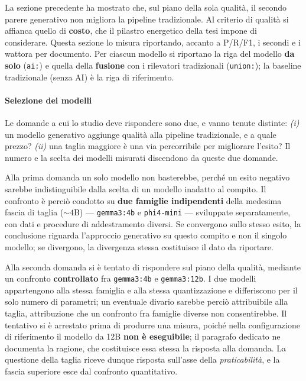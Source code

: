 La sezione precedente ha mostrato che, sul piano della sola qualità, il secondo parere generativo non migliora la pipeline tradizionale. Al criterio di qualità si affianca quello di \textbf{costo}, che il pilastro energetico della tesi impone di considerare. Questa sezione lo misura riportando, accanto a P/R/F1, i secondi e i wattora per documento. Per ciascun modello si riportano la riga del modello \textbf{da solo} (\texttt{ai:}) e quella della \textbf{fusione} con i rilevatori tradizionali (\texttt{union:}); la baseline tradizionale (senza AI) è la riga di riferimento.

\paragraph*{Selezione dei modelli} Le domande a cui lo studio deve rispondere sono due, e vanno tenute distinte: \emph{(i)} un modello generativo aggiunge qualità alla pipeline tradizionale, e a quale prezzo? \emph{(ii)} una taglia maggiore è una via percorribile per migliorare l'esito? Il numero e la scelta dei modelli misurati discendono da queste due domande.

Alla prima domanda un solo modello non basterebbe, perché un esito negativo sarebbe indistinguibile dalla scelta di un modello inadatto al compito. Il confronto è perciò condotto su \textbf{due famiglie indipendenti} della medesima fascia di taglia (${\sim}4$B) --- \texttt{gemma3:4b} e \texttt{phi4-mini} --- sviluppate separatamente, con dati e procedure di addestramento diversi. Se convergono sullo stesso esito, la conclusione riguarda l'approccio generativo su questo compito e non il singolo modello; se divergono, la divergenza stessa costituisce il dato da riportare.

Alla seconda domanda si è tentato di rispondere sul piano della qualità, mediante un confronto \textbf{controllato} fra \texttt{gemma3:4b} e \texttt{gemma3:12b}. I due modelli appartengono alla stessa famiglia e alla stessa quantizzazione e differiscono per il solo numero di parametri; un eventuale divario sarebbe perciò attribuibile alla taglia, attribuzione che un confronto fra famiglie diverse non consentirebbe. Il tentativo si è arrestato prima di produrre una misura, poiché nella configurazione di riferimento il modello da 12B \textbf{non è eseguibile}; il paragrafo dedicato ne documenta la ragione, che costituisce essa stessa la risposta alla domanda. La questione della taglia riceve dunque risposta sull'asse della \emph{praticabilità}, e la fascia superiore esce dal confronto quantitativo.

